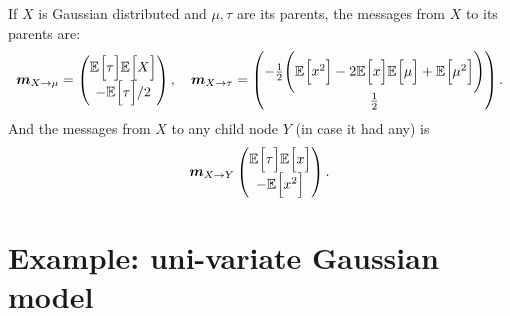 \begin{exampleth}
     If \( X \) is Gaussian distributed and \( \mu, \tau \) are its parents, the messages from \(X\) to its parents are:
     \[
           \bm{m}_{X \to \mu} = \begin{pmatrix}
                \mathbb{E}_{}\Big[\tau\Big]\mathbb{E}_{}\Big[X\Big]\\
                - \mathbb{E}_{}\Big[\tau\Big]/2
           \end{pmatrix}, \quad
           \bm{m}_{X \to \tau} = \begin{pmatrix}
               -\frac{1}{2}\Bigg( \mathbb{E}_{}\Big[x^2\Big] - 2\mathbb{E}_{}\Big[x\Big]\mathbb{E}_{}\Big[\mu\Big] + \mathbb{E}_{}\Big[\mu^2\Big] \Bigg)\\
               \frac{1}{2}
          \end{pmatrix}.
     \]
     And the messages from \( X \) to any child node \(Y\)  (in case it had any) is
     \[
          \bm{m}_{X \to Y}\begin{pmatrix}
               \mathbb{E}_{}\Big[\tau\Big]\mathbb{E}_{}\Big[x\Big]\\
               - \mathbb{E}_{}\Big[x^2\Big]
          \end{pmatrix}.
     \]
\end{exampleth}

\section{Example: uni-variate Gaussian model}\label{sec:vmp}

